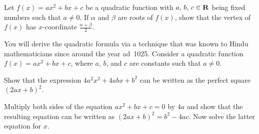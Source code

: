 \documentclass[a4paper,oneside,12pt]{article}
\begin{document}
\begin{problem}
\item Let $f(x) = ax^2 + bx + c$ be a quadratic function with
  ${a},\, {b},\, {c} \in \mathbf{R}$ being fixed numbers such that
  $a \neq 0$.  If $\alpha$ and $\beta$ are roots of $f(x)$, show that
  the vertex of $f(x)$ has $x$-coordinate $\frac{\alpha + \beta}{2}$.

\item You will derive the quadratic formula via a technique that was
  known to Hindu mathematicians since around the year {\sc ad}~1025.
  Consider a quadratic function $f(x) = ax^2 + bx + c$, where $a$,
  $b$, and $c$ are constants such that $a \neq 0$.
  \begin{packedenum}
  \item\label{subprob:quadratic_roots:formula_Hindu_perfect_square}
    Show that the expression $4a^2x^2 + 4abx + b^2$ can be written as
    the perfect square $(2ax + b)^2$.

  \item\label{subprob:quadratic_roots:formula_Hindu_multiply_4}
    Multiply both sides of the equation $ax^2 + bx + c = 0$ by $4a$
    and show that the resulting equation can be written as
    $(2ax + b)^2 = b^2 - 4ac$.  Now solve the latter equation for
    $x$.
  \end{packedenum}
\end{problem}
\end{document}
